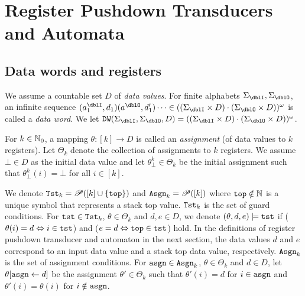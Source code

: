 \section{Register Pushdown Transducers and Automata}
\subsection{Data words and registers}
We assume a countable set $D$ of \emph{data values}.
For finite alphabets $\Sigma_\dblI,\Sigma_\dblO$,
an infinite sequence $(a^\dblI_1,d_1)(a^\dblO,d'_1)\cdots \in ((\Sigma_\dblI\times D)\cdot(\Sigma_\dblO\times D))^\omega$ is called a \emph{data word}.
We let $\DW(\Sigma_\dblI,\Sigma_\dblO,D)=((\Sigma_\dblI\times D)\cdot(\Sigma_\dblO\times D))^\omega$.

For $k\in\mathbb{N}_0$, a mapping $\theta: [k] \to D$ is called an \emph{assignment}
(of data values to $k$ registers).
Let $\Theta_k$ denote the collection of assignments to $k$ registers.
We assume $\bot\in D$ as the initial data value and
let $\theta^k_\bot\in\Theta_k$ be the initial assignment such that
$\theta^k_\bot(i)=\bot$ for all $i\in[k]$.

We denote $\mathtt{Tst}_k = \mathscr{P}([k]\cup\{\mathtt{top}\})$ and $\mathtt{Asgn}_k = \mathscr{P}([k])$
where $\mathtt{top}\notin\mathbb{N}$ is a unique symbol that represents a stack top value.
$\mathtt{Tst}_k$ is the set of guard conditions.
For $\mathtt{tst}\in\mathtt{Tst}_k$, $\theta\in\Theta_k$ and $d,e\in D$,
we denote $(\theta,d,e)\models\mathtt{tst}$
if ($\theta(i) = d \Leftrightarrow i\in\mathtt{tst}$)
and ($e = d \Leftrightarrow \mathtt{top}\in\mathtt{tst}$) hold.
In the definitions of register pushdown transducer and automaton in the next section,
the data values $d$ and $e$ correspond to an input data value and a stack top data value, respectively.
$\mathtt{Asgn}_k$ is the set of assignment conditions.
For $\mathtt{asgn}\in\mathtt{Asgn}_k$, $\theta\in\Theta_k$ and $d\in D$,
let $\theta[\mathtt{asgn}\leftarrow d]$ be the assignment
$\theta'\in\Theta_k$ such that $\theta'(i) = d$ for $i\in\mathtt{asgn}$ and $\theta'(i)=\theta(i)$ for $i\notin\mathtt{asgn}$.

